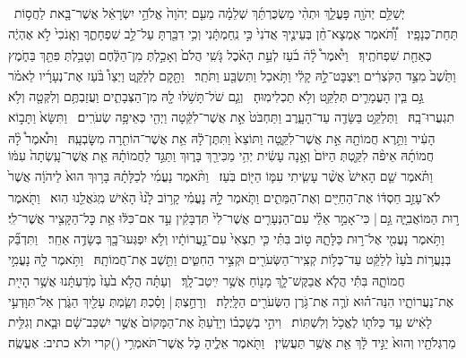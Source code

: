 \documentclass[12pt]{article}
\newcommand{\loc}[1]{\textsuperscript{\locf{#1}}}
\begin{document}
{\loc{ יב}~}‏יְשַׁלֵּ֥ם יְהֹוָ֖ה פָּעֳלֵ֑ךְ וּתְהִ֨י מַשְׂכֻּרְתֵּ֜ךְ שְׁלֵמָ֗ה מֵעִ֤ם יְהֹוָה֙ אֱלֹהֵ֣י יִשְׂרָאֵ֔ל אֲשֶׁר־בָּ֖את לַחֲס֥וֹת תַּחַת־כְּנָפָֽיו׃
{\loc{ יג}~}‏וַ֠תֹּ֠אמֶר אֶמְצָא־חֵ֨ן בְּעֵינֶ֤יךָ אֲדֹנִי֙ כִּ֣י נִֽחַמְתָּ֔נִי וְכִ֥י דִבַּ֖רְתָּ עַל־לֵ֣ב שִׁפְחָתֶ֑ךָ וְאָֽנֹכִי֙ לֹ֣א אֶהְיֶ֔ה כְּאַחַ֖ת שִׁפְחֹתֶֽיךָ׃
{\loc{ יד}~}‏וַיֹּ֩אמֶר֩ לָ֨הֿ בֹ֜עַז לְעֵ֣ת הָאֹ֗כֶל גֹּ֤שִֽׁי הֲלֹם֙ וְאָכַ֣לְתְּ מִן־הַלֶּ֔חֶם וְטָבַ֥לְתְּ פִּתֵּ֖ךְ בַּחֹ֑מֶץ וַתֵּ֙שֶׁב֙ מִצַּ֣ד הַקֹּצְרִ֔ים וַיִּצְבׇּט־לָ֣הּ קָלִ֔י וַתֹּ֥אכַל וַתִּשְׂבַּ֖ע וַתֹּתַֽר׃
{\loc{ טו}~}‏וַתָּ֖קׇם לְלַקֵּ֑ט וַיְצַו֩ בֹּ֨עַז אֶת־נְעָרָ֜יו לֵאמֹ֗ר גַּ֣ם בֵּ֧ין הָעֳמָרִ֛ים תְּלַקֵּ֖ט וְלֹ֥א תַכְלִימֽוּהָ׃
{\loc{ טז}~}‏וְגַ֛ם שֹׁל־תָּשֹׁ֥לּוּ לָ֖הּ מִן־הַצְּבָתִ֑ים וַעֲזַבְתֶּ֥ם וְלִקְּטָ֖ה וְלֹ֥א תִגְעֲרוּ־בָֽהּ׃
{\loc{ יז}~}‏וַתְּלַקֵּ֥ט בַּשָּׂדֶ֖ה עַד־הָעָ֑רֶב וַתַּחְבֹּט֙ אֵ֣ת אֲשֶׁר־לִקֵּ֔טָה וַיְהִ֖י כְּאֵיפָ֥ה שְׂעֹרִֽים׃
{\loc{ יח}~}‏וַתִּשָּׂא֙ וַתָּב֣וֹא הָעִ֔יר וַתֵּ֥רֶא חֲמוֹתָ֖הּ אֵ֣ת אֲשֶׁר־לִקֵּ֑טָה וַתּוֹצֵא֙ וַתִּתֶּן־לָ֔הּ אֵ֥ת אֲשֶׁר־הוֹתִ֖רָה מִשׇּׂבְעָֽהּ׃
{\loc{ יט}~}‏וַתֹּ֩אמֶר֩ לָ֨הּ חֲמוֹתָ֜הּ אֵיפֹ֨ה לִקַּ֤טְתְּ הַיּוֹם֙ וְאָ֣נָה עָשִׂ֔ית יְהִ֥י מַכִּירֵ֖ךְ בָּר֑וּךְ וַתַּגֵּ֣ד לַחֲמוֹתָ֗הּ אֵ֤ת אֲשֶׁר־עָֽשְׂתָה֙ עִמּ֔וֹ וַתֹּ֗אמֶר שֵׁ֤ם הָאִישׁ֙ אֲשֶׁ֨ר עָשִׂ֧יתִי עִמּ֛וֹ הַיּ֖וֹם בֹּֽעַז׃
{\loc{ כ}~}‏וַתֹּ֨אמֶר נָעֳמִ֜י לְכַלָּתָ֗הּ בָּר֥וּךְ הוּא֙ לַיהֹוָ֔ה אֲשֶׁר֙ לֹא־עָזַ֣ב חַסְדּ֔וֹ אֶת־הַחַיִּ֖ים וְאֶת־הַמֵּתִ֑ים וַתֹּ֧אמֶר לָ֣הּ נָעֳמִ֗י קָר֥וֹב לָ֙נוּ֙ הָאִ֔ישׁ מִֽגֹּאֲלֵ֖נוּ הֽוּא׃
{\loc{ כא}~}‏וַתֹּ֖אמֶר ר֣וּת הַמּוֹאֲבִיָּ֑ה גַּ֣ם |  כִּי־אָמַ֣ר אֵלַ֗י עִם־הַנְּעָרִ֤ים אֲשֶׁר־לִי֙ תִּדְבָּקִ֔ין עַ֣ד אִם־כִּלּ֔וּ אֵ֥ת כׇּל־הַקָּצִ֖יר אֲשֶׁר־לִֽי׃
{\loc{ כב}~}‏וַתֹּ֥אמֶר נָעֳמִ֖י אֶל־ר֣וּת כַּלָּתָ֑הּ ט֣וֹב בִּתִּ֗י כִּ֤י תֵצְאִי֙ עִם־נַ֣עֲרוֹתָ֔יו וְלֹ֥א יִפְגְּעוּ־בָ֖ךְ בְּשָׂדֶ֥ה אַחֵֽר׃
{\loc{ כג}~}‏וַתִּדְבַּ֞ק בְּנַעֲר֥וֹת בֹּ֙עַז֙ לְלַקֵּ֔ט עַד־כְּל֥וֹת קְצִֽיר־הַשְּׂעֹרִ֖ים וּקְצִ֣יר הַחִטִּ֑ים וַתֵּ֖שֶׁב אֶת־חֲמוֹתָֽהּ׃
\ledsidenote{{\loc{ג פרק}}}
{\loc{ א}~}‏וַתֹּ֥אמֶר לָ֖הּ נָעֳמִ֣י חֲמוֹתָ֑הּ בִּתִּ֕י הֲלֹ֧א אֲבַקֶּשׁ־לָ֛ךְ מָנ֖וֹחַ אֲשֶׁ֥ר יִֽיטַב־לָֽךְ׃
{\loc{ ב}~}‏וְעַתָּ֗ה הֲלֹ֥א בֹ֙עַז֙ מֹֽדַעְתָּ֔נוּ אֲשֶׁ֥ר הָיִ֖ית אֶת־נַעֲרוֹתָ֑יו הִנֵּה־ה֗וּא זֹרֶ֛ה אֶת־גֹּ֥רֶן הַשְּׂעֹרִ֖ים הַלָּֽיְלָה׃
{\loc{ ג}~}‏וְרָחַ֣צְתְּ |  וָסַ֗כְתְּ וְשַׂ֧מְתְּ  עָלַ֖יִךְ  הַגֹּ֑רֶן אַל־תִּוָּדְעִ֣י לָאִ֔ישׁ עַ֥ד כַּלֹּת֖וֹ לֶאֱכֹ֥ל וְלִשְׁתּֽוֹת׃
{\loc{ ד}~}‏וִיהִ֣י בְשׇׁכְב֗וֹ וְיָדַ֙עַתְּ֙ אֶת־הַמָּקוֹם֙ אֲשֶׁ֣ר יִשְׁכַּב־שָׁ֔ם וּבָ֛את וְגִלִּ֥ית מַרְגְּלֹתָ֖יו  וְהוּא֙ יַגִּ֣יד לָ֔ךְ אֵ֖ת אֲשֶׁ֥ר תַּעֲשִֽׂין׃
{\loc{ ה}~}‏וַתֹּ֖אמֶר אֵלֶ֑יהָ כֹּ֛ל אֲשֶׁר־תֹּאמְרִ֥י (){קרי ולא כתיב: } אֶעֱשֶֽׂה׃
\end{document}
